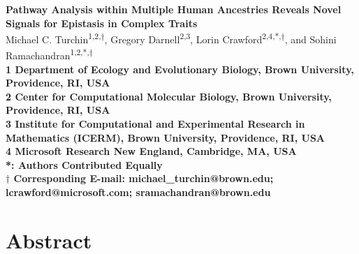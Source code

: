 \documentclass[10pt]{article}
\begin{document}
\linenumbers
\begin{flushleft}
{\Large
\textbf{Pathway Analysis within Multiple Human Ancestries Reveals Novel Signals for Epistasis in Complex Traits}
}
\newline
\\
Michael C. Turchin\textsuperscript{1,2,$\dagger$}, Gregory Darnell\textsuperscript{2,3}, Lorin Crawford\textsuperscript{2,4,*,$\dagger$}, and Sohini Ramachandran\textsuperscript{1,2,*,$\dagger$} 
\\
\bigskip
\bf{1} Department of Ecology and Evolutionary Biology, Brown University, Providence, RI, USA
\\
\bf{2} Center for Computational Molecular Biology, Brown University, Providence, RI, USA
\\
\bf{3} Institute for Computational and Experimental Research in Mathematics (ICERM), Brown University, Providence, RI, USA
\\
\bf{4} Microsoft Research New England, Cambridge, MA, USA
\\
\bigskip
*: Authors Contributed Equally\\
$\dagger$ Corresponding E-mail: michael\_turchin@brown.edu; lcrawford@microsoft.com; sramachandran@brown.edu 
\end{flushleft}


\section*{Abstract}\label{MAPITR-Abstract} 
\end{document}
